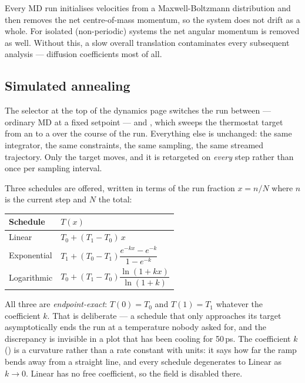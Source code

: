 \begin{calnote}
Every MD run initialises velocities from a Maxwell-Boltzmann distribution
and then removes the net centre-of-mass momentum, so the system does not
drift as a whole. For isolated (non-periodic) systems the net angular
momentum is removed as well. Without this, a slow overall translation
contaminates every subsequent analysis --- diffusion coefficients most of
all.
\end{calnote}

\subsection{Simulated annealing}
\label{sec:annealing}

The  selector at the top of the dynamics page switches the run
between  --- ordinary MD at a fixed setpoint ---
and , which sweeps the thermostat target from an
 to a  over the course of
the run. Everything else is unchanged: the same integrator, the same
constraints, the same sampling, the same streamed trajectory. Only the
target moves, and it is retargeted on \emph{every} step rather than once
per sampling interval.

Three schedules are offered, written in terms of the run fraction
$x = n / N$ where $n$ is the current step and $N$ the total:

\begin{center}
\small
\begin{tabular}{@{}lp{8.4cm}@{}}
\toprule
Schedule & $T(x)$ \\
\midrule
Linear & $T_0 + (T_1 - T_0)\,x$ \\
Exponential & $T_1 + (T_0 - T_1)\dfrac{e^{-kx} - e^{-k}}{1 - e^{-k}}$ \\
Logarithmic & $T_0 + (T_1 - T_0)\dfrac{\ln(1 + kx)}{\ln(1 + k)}$ \\
\bottomrule
\end{tabular}
\end{center}

All three are \emph{endpoint-exact}: $T(0) = T_0$ and $T(1) = T_1$
whatever the coefficient $k$. That is deliberate --- a schedule that only
approaches its target asymptotically ends the run at a temperature nobody
asked for, and the discrepancy is invisible in a plot that has been
cooling for 50\,ps. The coefficient $k$ () is a
curvature rather than a rate constant with units: it says how far the
ramp bends away from a straight line, and every schedule degenerates to
Linear as $k \to 0$. Linear has no free coefficient, so the field is
disabled there.

